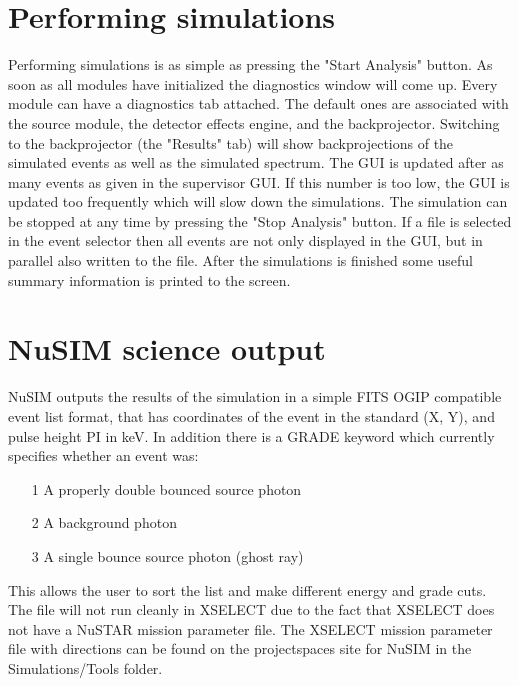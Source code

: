 \section{Performing simulations}

Performing simulations is as simple as pressing the "Start Analysis" button. 
As soon as all modules have initialized the diagnostics window will come up. 
Every module can have a diagnostics tab attached. 
The default ones are associated with the source module, the detector effects engine, and the backprojector.
Switching to the backprojector (the "Results" tab) will show backprojections of the simulated events as well as the simulated spectrum.
The GUI is updated after as many events as given in the supervisor GUI.
If this number is too low, the GUI is updated too frequently which will slow down the simulations.
The simulation can be stopped at any time by pressing the "Stop Analysis" button.
If a file is selected in the event selector then all events are not only displayed in the GUI, but in parallel also written to the file.
After the simulations is finished some useful summary information is printed to the screen.

\section{NuSIM science output}

NuSIM outputs the results of the simulation in a simple FITS OGIP compatible event list format, that has coordinates of the event in the standard (X, Y), and pulse height PI in keV. In addition there is a GRADE keyword which currently specifies whether an event was:
\begin{itemize}
\item[1] A properly double bounced source photon
\item[2] A background photon
\item[3] A single bounce source photon (ghost ray)
\end{itemize} 

This allows the user to sort the list and make different energy and grade cuts. The file will not run cleanly in XSELECT due to the fact that XSELECT does not have a NuSTAR mission parameter file. The XSELECT mission parameter file with directions can be found on the projectspaces site for NuSIM in the Simulations/Tools folder.

%
